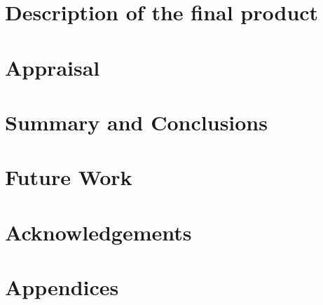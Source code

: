 \documentclass[twocolumn]{article}
\begin{document}
\section{Description of the final product}
\label{sec:org0d48ef5}

\section{Appraisal}
\label{sec:org5bd60a9}

\section{Summary and Conclusions}
\label{sec:orgc2a7d03}

\section{Future Work}
\label{sec:orgdb5fdcd}

\section*{Acknowledgements}

\printbibliography

\section*{Appendices}
\end{document}
